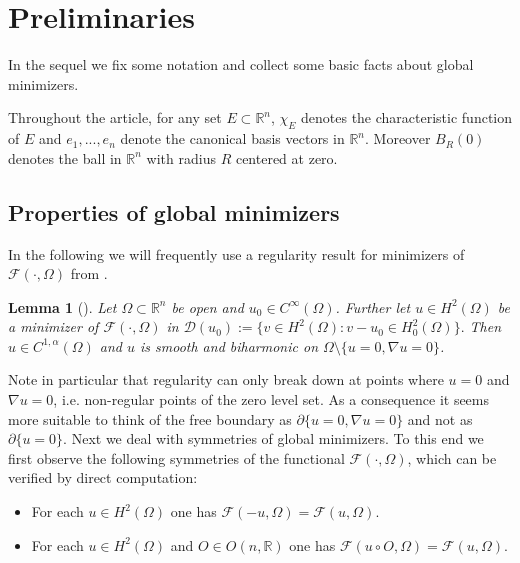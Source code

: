 \documentclass[twoside,11pt]{article}
\newtheorem{lemma}{Lemma}
\theoremstyle{definition}
\begin{document}
\section{Preliminaries}\label{sec:Prelim}

In the sequel we fix some notation and collect some basic facts about global minimizers.

Throughout the article, for any set $E \subset \mathbb{R}^n$, $\chi_E$ denotes the characteristic function of $E$ and $e_1,...,e_n$ denote the canonical basis vectors in $\mathbb{R}^n$. Moreover $B_R(0)$ denotes the ball in $\mathbb{R}^n$ with radius $R$ centered at zero.  


\subsection{Properties of global minimizers}

In the following we will frequently use a regularity result for minimizers of $\mathcal{F}(\cdot ,\Omega)$ from \cite[Theorem 2]{GMMathAnn}.

\begin{lemma}[{\cite[Theorem 2]{GMMathAnn}}]\label{leminteriorregularity}
    Let $\Omega \subset \mathbb{R}^n$ be open and $u_0 \in C^\infty(\Omega)$. Further let $u \in H^2(\Omega)$ be a minimizer of $\mathcal{F}(\cdot, \Omega)$ in $\mathscr{D}(u_0):= \{ v \in H^2(\Omega) : v -u_0 \in H_0^2(\Omega) \}.$ Then $u \in C^{1,\alpha}(\Omega)$ and $u$ is smooth and biharmonic on $\Omega \setminus \{ u = 0, \nabla u = 0 \}$. 
\end{lemma} 
Note in particular that regularity can only break down at points where $u = 0$ and $\nabla u = 0$, i.e. non-regular points of the zero level set. As a consequence it seems more suitable to think of the free boundary as $\partial \{u = 0, \nabla u = 0 \}$ and not as $\partial \{ u = 0 \}$. 
Next we deal with symmetries of global minimizers. To this end we first observe the following symmetries of the functional $\mathcal{F}(\cdot, \Omega)$, which can be verified by direct computation:
\begin{itemize}
    \item For each $u \in H^2(\Omega)$ one has $\mathcal{F}(-u,\Omega)= \mathcal{F}(u,\Omega)$.
    \item  For each $u \in H^2(\Omega)$ and $O \in O(n,\mathbb{R})$ one has $\mathcal{F}(u \circ O,\Omega)= \mathcal{F}(u,\Omega)$.
\end{itemize}
\end{document}
